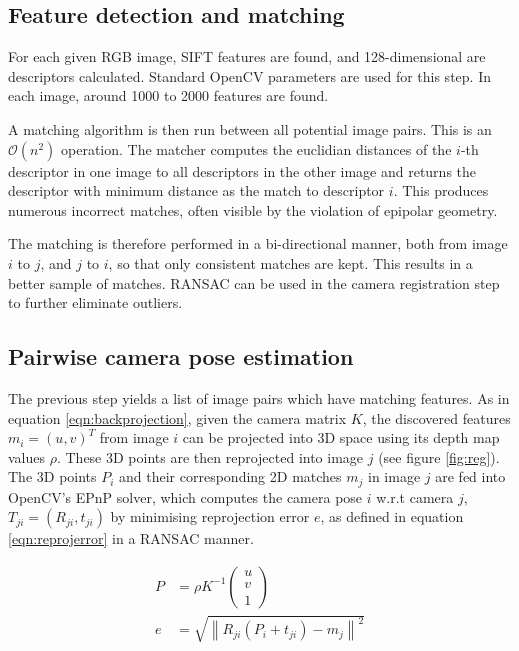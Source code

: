 \documentclass[10pt,twocolumn,letterpaper]{article}
\newcommand{\norm}[1]{\left\lVert #1 \right\rVert}
\begin{document}
\subsection{Feature detection and matching}\label{sec:extractfeature}

For each given RGB image, SIFT features are found, and 128-dimensional are
descriptors calculated. Standard OpenCV parameters are used for this step.
In each image, around 1000 to 2000 features are found.

A matching algorithm is then run between all potential image pairs. This is
an $\mathcal{O}(n^2)$ operation. The matcher computes the euclidian distances of the $i$-th descriptor in one image to all descriptors in the other image and returns the descriptor with minimum distance as the match to descriptor $i$. This produces numerous
incorrect matches, often visible by the violation of epipolar geometry.

The matching is therefore performed in a bi-directional manner, both from image
$i$ to $j$, and $j$ to $i$, so that only consistent matches are kept. This results in a better sample of matches. RANSAC
can be used in the camera registration step to further eliminate outliers.




\subsection{Pairwise camera pose estimation}

The previous step yields a list of image pairs which have matching features.
As in equation \ref{eqn:backprojection}, given the camera matrix $K$, the discovered features $m_{i} = (u,v)^{T}$ from image $i$ can be projected into 3D space
using its depth map values $\rho$. These 3D points are then reprojected into image $j$ (see figure \ref{fig:reg}). The 3D points $P_{i}$ and their corresponding 2D matches $m_{j}$ in image $j$ are fed into OpenCV's EPnP solver, which computes the camera pose $i$ w.r.t camera $j$, $T_{ji} = \left(R_{ji}, t_{ji}\right)$ by minimising reprojection error $e$, as defined in equation \ref{eqn:reprojerror} in a RANSAC manner.

\begin{align}
P &= \rho K^{-1} \begin{pmatrix}
u\\v\\1
\end{pmatrix} \label{eqn:backprojection}\\
e &= \sqrt{\norm{R_{ji}\left(P_{i}+t_{ji}\right)-m_{j}}^2} \label{eqn:reprojerror}
\end{align}
\end{document}
